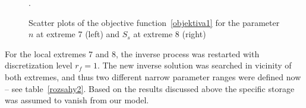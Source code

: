 \documentclass[review]{elsarticle}
\begin{document}
\begin{figure}
\label{objfnc6.2}
\caption{Scatter plots of the objective function~\eqref{objektiva1} for the parameter $n$ at extreme 7 (left)  and $S_s$ at extreme 8  (right)}.
\end{figure}

For the local extremes 7 and 8, the inverse process was restarted with discretization level $r_f=1$. 
The new inverse solution was searched in  vicinity of both extremes, and thus two different narrow parameter ranges were defined now -- see table~\ref{rozsahy2}. Based on the results discussed above the specific storage was assumed to vanish from our model. 
\end{document}
